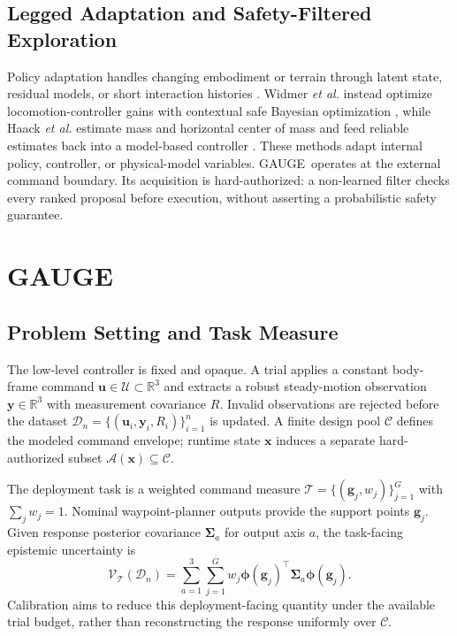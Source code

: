 \documentclass[letterpaper,10pt,conference]{ieeeconf}
\newcommand{\method}{GAUGE}
\newcommand{\vect}[1]{\boldsymbol{#1}}
\begin{document}
\subsection{Legged Adaptation and Safety-Filtered Exploration}

Policy adaptation handles changing embodiment or terrain through latent state,
residual models, or short interaction histories
\cite{kumar2021rma,sun2021unknown,fey2024adapt,li2026embodiment}. Widmer
\emph{et al.} instead optimize locomotion-controller gains with contextual safe
Bayesian optimization \cite{widmer2023safe}, while Haack \emph{et al.} estimate
mass and horizontal center of mass and feed reliable estimates back into a
model-based controller \cite{haack2025adaptive}. These methods adapt internal
policy, controller, or physical-model variables. \method\ operates at the
external command boundary. Its acquisition is hard-authorized: a non-learned
filter checks every ranked proposal before execution, without asserting a
probabilistic safety guarantee.

\section{GAUGE}

\subsection{Problem Setting and Task Measure}

The low-level controller is fixed and opaque. A trial applies a constant
body-frame command $\vect{u}\in\mathcal{U}\subset\mathbb{R}^{3}$ and extracts a
robust steady-motion observation $\vect{y}\in\mathbb{R}^{3}$ with measurement
covariance $R$. Invalid observations are rejected before the dataset
$\mathcal{D}_n=\{(\vect{u}_i,\vect{y}_i,R_i)\}_{i=1}^{n}$ is updated. A finite
design pool $\mathcal{C}$ defines the modeled command envelope; runtime state
$\vect{x}$ induces a separate hard-authorized subset
$\mathcal{A}(\vect{x})\subseteq\mathcal{C}$.

The deployment task is a weighted command measure
$\mathcal{T}=\{(\vect{g}_j,w_j)\}_{j=1}^{G}$ with $\sum_jw_j=1$. Nominal
waypoint-planner outputs provide the support points $\vect{g}_j$. Given response
posterior covariance $\vect{\Sigma}_a$ for output axis $a$, the task-facing
epistemic uncertainty is
\begin{equation}
 \mathcal{V}_{\mathcal{T}}(\mathcal{D}_n)=
 \sum_{a=1}^{3}\sum_{j=1}^{G} w_j
 \vect{\phi}(\vect{g}_j)^\top\vect{\Sigma}_a
 \vect{\phi}(\vect{g}_j).
 \label{eq:taskvariance}
\end{equation}
Calibration aims to reduce this deployment-facing quantity under the available
trial budget, rather than reconstructing the response uniformly over
$\mathcal{C}$.
\end{document}

